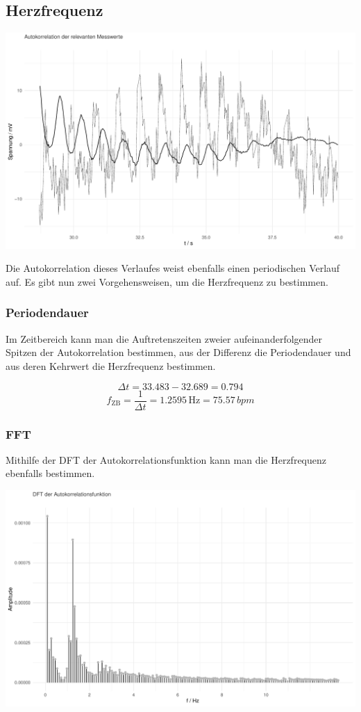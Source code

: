 \documentclass{article}
\begin{document}
\subsection{Herzfrequenz}

\includegraphics[width=\textwidth]{graphics/correlation.pdf}

Die Autokorrelation dieses Verlaufes weist ebenfalls einen periodischen Verlauf auf. Es gibt nun zwei Vorgehensweisen, um die Herzfrequenz zu bestimmen.

\subsubsection{Periodendauer}
Im Zeitbereich kann man die Auftretenszeiten zweier aufeinanderfolgender Spitzen der Autokorrelation bestimmen, aus der Differenz die Periodendauer und aus deren Kehrwert die Herzfrequenz bestimmen.

\[\Delta t = 33.483 - 32.689 = 0.794\]
\[f_{\text{ZB}} = \frac{1}{\Delta t} = 1.2595 \, \si{\hertz} = 75.57 \, \si{bpm}\]

\subsubsection{FFT}
Mithilfe der DFT der Autokorrelationsfunktion kann man die Herzfrequenz ebenfalls bestimmen.

\includegraphics[width=\textwidth]{graphics/corr_fft.pdf}
\end{document}
